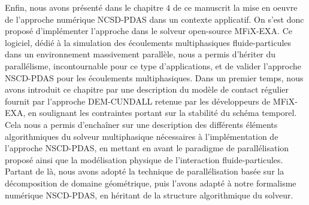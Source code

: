 Enfin, nous avons présenté dans le chapitre $4$ de ce manuscrit la mise en oeuvre de l'approche numérique NCSD-PDAS dans un contexte applicatif. On s'est donc proposé d'implémenter l'approche dans le solveur open-source MFiX-EXA. Ce logiciel, dédié à la simulation des écoulements multiphasiques fluide-particules dans un environnement massivement parallèle, nous
a permis d’hériter du parallélisme, incontournable pour ce type d'applications, et de valider l'approche NSCD-PDAS pour les écoulements multiphasiques. Dans un premier temps, nous avons introduit ce chapitre par une description du modèle de contact régulier fournit par l'approche DEM-CUNDALL retenue par les développeurs de MFiX-EXA, en soulignant les contraintes portant sur la stabilité du schéma temporel. Cela nous a permis d'enchaîner sur une description des différents éléments algorithmiques du solveur multiphasique nécessaires à l'implémentation de l'approche NSCD-PDAS, en mettant en avant le paradigme de parallélisation proposé ainsi que la modélisation physique de l'interaction fluide-particules. Partant de là, nous avons adopté la technique de parallélisation basée sur la décomposition de domaine géométrique, puis l'avons adapté à notre formalisme numérique NSCD-PDAS, en héritant de la structure algorithmique du solveur.\\
